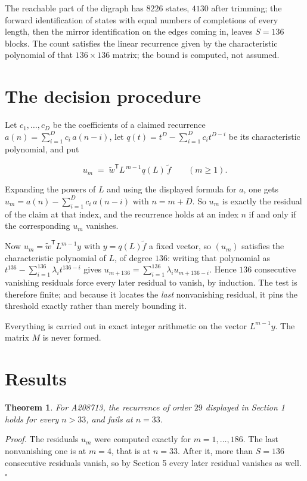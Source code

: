 \documentclass[11pt]{article}
\newtheorem{theorem}{Theorem}
\theoremstyle{definition}
\begin{document}
The reachable part of the digraph has $8226$ states, $4130$ after trimming; the forward identification of states with equal numbers of completions of every length, then the mirror identification on the edges coming in, leaves $S = 136$ blocks. The count satisfies the linear recurrence given by the characteristic polynomial of that $136\times136$ matrix; the bound is computed, not assumed.

\section{The decision procedure}

Let $c_1,\dots,c_D$ be the coefficients of a claimed recurrence $a(n) = \sum_{i=1}^{D} c_i\,a(n-i)$, let $q(t) = t^{D} - \sum_{i=1}^{D} c_i t^{D-i}$ be its characteristic polynomial, and put

\[u_m \;=\; \tilde w^{\mathsf T} L^{\,m-1} q(L)\,\tilde f \qquad (m \ge 1).\]

Expanding the powers of $L$ and using the displayed formula for $a$, one gets $u_m = a(n) - \sum_{i=1}^{D} c_i\,a(n-i)$ with $n = m + D$. So $u_m$ is exactly the residual of the claim at that index, and the recurrence holds at an index $n$ if and only if the corresponding $u_m$ vanishes.

Now $u_m = \tilde w^{\mathsf T} L^{m-1} y$ with $y = q(L)\tilde f$ a fixed vector, so $(u_m)$ satisfies the characteristic polynomial of $L$, of degree $136$: writing that polynomial as $t^{136} - \sum_{i=1}^{136} \lambda_i t^{136-i}$ gives $u_{m+136} = \sum_{i=1}^{136} \lambda_i u_{m+136-i}$. Hence $136$ consecutive vanishing residuals force every later residual to vanish, by induction. The test is therefore finite; and because it locates the {\itshape last} nonvanishing residual, it pins the threshold exactly rather than merely bounding it.

Everything is carried out in exact integer arithmetic on the vector $L^{m-1}y$. The matrix $M$ is never formed.

\section{Results}

\begin{theorem} For A208713, the recurrence of order $29$ displayed in Section 1 holds for every $n > 33$, and fails at $n = 33$.\end{theorem}

{\itshape Proof.} The residuals $u_m$ were computed exactly for $m = 1,\dots,186$. The last nonvanishing one is at $m = 4$, that is at $n = 33$. After it, more than $S = 136$ consecutive residuals vanish, so by Section 5 every later residual vanishes as well. $\square$
\end{document}
